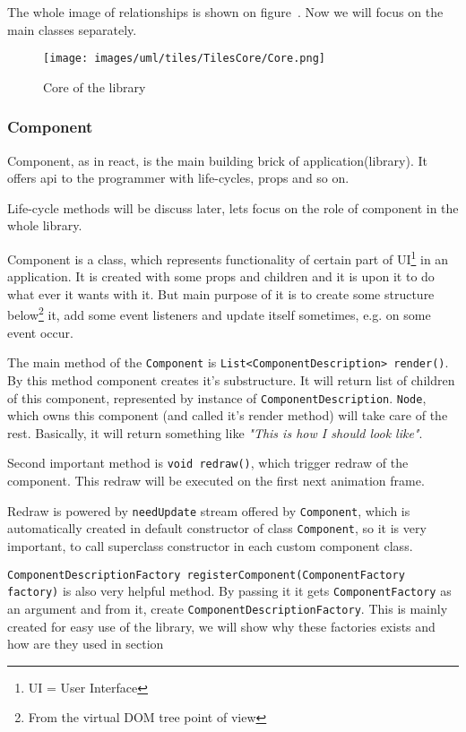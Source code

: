     The whole image of relationships is shown on figure~. Now we will focus on the main classes separately. 
    \begin{figure}[h]
    \centering  
      \texttt{[image: images/uml/tiles/TilesCore/Core.png]}
      \caption{Core of the library}
      \label{img:library-core}
    \end{figure}

    \subsubsection{Component}\label{subsubsec:our-architecture-core-component}
      Component, as in react, is the main building brick of application(library). 
      It offers api to the programmer with life-cycles, props and so on. 

      Life-cycle methods will be discuss later, lets focus on the role of component in the whole library.

      Component is a class, which represents functionality of certain part of UI\footnote{UI = User Interface} in an application.
      It is created with some props and children and it is upon it to do what ever it wants with it. 
      But main purpose of it is to create some structure below\footnote{From the virtual DOM tree point of view} it, 
      add some event listeners and update itself sometimes, e.g. on some event occur.

      The main method of the \texttt{Component} is \texttt{List<ComponentDescription> render()}. 
      By this method component creates it's substructure.
      It will return list of children of this component, represented by instance of \texttt{ComponentDescription}. 
      \texttt{Node}, which owns this component (and called it's render method) will take care of the rest.
      Basically, it will return something like \textit{"This is how I should look like"}.

      Second important method is \texttt{void redraw()}, which trigger redraw of the component. 
      This redraw will be executed on the first next animation frame. 

      Redraw is powered by \texttt{needUpdate} stream offered by \texttt{Component}, 
      which is automatically created in default constructor of class \texttt{Component}, 
      so it is very important, to call superclass constructor in each custom component class.

      \texttt{ComponentDescriptionFactory registerComponent(ComponentFactory factory)} is also very helpful method. 
      By passing it it gets \texttt{ComponentFactory} as an argument and from it, create \texttt{ComponentDescriptionFactory}. 
      This is mainly created for easy use of the library, we will show why these factories exists and how are they used in section~
      

